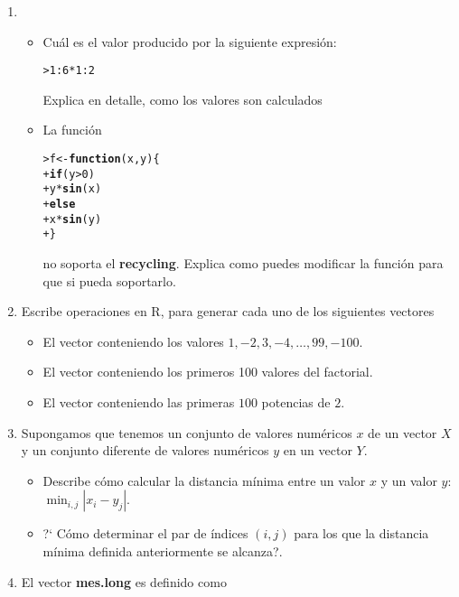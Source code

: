 \documentclass{article}\usepackage[]{graphicx}\usepackage[]{color}
\makeatletter
\newcommand{\hlnum}[1]{\textcolor[rgb]{0.686,0.059,0.569}{#1}}%
\newcommand{\hlopt}[1]{\textcolor[rgb]{0,0,0}{#1}}%
\newcommand{\hlstd}[1]{\textcolor[rgb]{0.345,0.345,0.345}{#1}}%
\newcommand{\hlkwa}[1]{\textcolor[rgb]{0.161,0.373,0.58}{\textbf{#1}}}%
\newcommand{\hlkwb}[1]{\textcolor[rgb]{0.69,0.353,0.396}{#1}}%
\newcommand{\hlkwc}[1]{\textcolor[rgb]{0.333,0.667,0.333}{#1}}%
\newcommand{\hlkwd}[1]{\textcolor[rgb]{0.737,0.353,0.396}{\textbf{#1}}}%
\newenvironment{kframe}{%
 \def\at@end@of@kframe{}%
 \ifinner\ifhmode%
  \def\at@end@of@kframe{\end{minipage}}%
  \begin{minipage}{\columnwidth}%
 \fi\fi%
 \def\FrameCommand##1{\hskip\@totalleftmargin \hskip-\fboxsep
 \colorbox{shadecolor}{##1}\hskip-\fboxsep
     \hskip-\linewidth \hskip-\@totalleftmargin \hskip\columnwidth}%
 \MakeFramed {\advance\hsize-\width
   \@totalleftmargin\z@ \linewidth\hsize
   \@setminipage}}%
 {\par\unskip\endMakeFramed%
 \at@end@of@kframe}
\newenvironment{knitrout}{}{} %
\makeatother
\begin{document}
\begin{enumerate}
\item
\begin{itemize}
\item Cu\'al es el valor producido por la siguiente expresi\'on:
\begin{knitrout}
\color{fgcolor}\begin{kframe}
\begin{alltt}
\hlstd{> }\hlnum{1}\hlopt{:}\hlnum{6} \hlopt{*} \hlnum{1}\hlopt{:}\hlnum{2}
\end{alltt}
\end{kframe}
\end{knitrout}
Explica en detalle, como los valores son calculados
\item La funci\'on 
\begin{knitrout}
\color{fgcolor}\begin{kframe}
\begin{alltt}
\hlstd{> }\hlstd{f} \hlkwb{<-}\hlkwa{function}\hlstd{(}\hlkwc{x}\hlstd{,}\hlkwc{y}\hlstd{)\{}
\hlstd{+ }  \hlkwa{if}\hlstd{(y} \hlopt{>} \hlnum{0}\hlstd{)}
\hlstd{+ }    \hlstd{y} \hlopt{*}\hlkwd{sin}\hlstd{(x)}
\hlstd{+ }  \hlkwa{else}
\hlstd{+ }    \hlstd{x}\hlopt{*}\hlkwd{sin}\hlstd{(y)}
\hlstd{+ }\hlstd{\}}
\end{alltt}
\end{kframe}
\end{knitrout}
no soporta el \textbf{recycling}. Explica como puedes modificar la funci\'on para que si pueda soportarlo.
\end{itemize}

\item Escribe operaciones en R, para generar cada uno de los siguientes vectores
\begin{itemize}
\item El vector conteniendo los valores $ 1, -2, 3, -4, \dots, 99, -100$.
\item El vector conteniendo los primeros 100 valores del factorial.
\item El vector conteniendo las primeras $100$ potencias de $2$.
\end{itemize}
\item Supongamos que tenemos un conjunto de valores  num\'ericos $x$ de un vector $X$ y un conjunto diferente de valores  num\'ericos $y$ en un vector $Y$.

\begin{itemize}
\item Describe c\'omo calcular la distancia m\'inima entre un valor  $x$ y un valor $y$: $\min_{i,j}|x_i -y_j|$.
\item ?` C\'omo determinar el par de  \'indices $(i, j)$ para los que la distancia m\'inima definida anteriormente se alcanza?.
\end{itemize}
\item El vector \textbf{mes.long} es definido como 


\end{enumerate}
\end{document}
